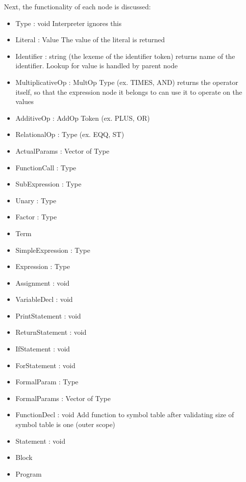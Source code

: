 Next, the functionality of each node is discussed:
\begin{itemize}
	\item Type : void
		\subitem Interpreter ignores this
	\item Literal : Value
		\subitem The value of the literal is returned
	\item Identifier : string (the lexeme of the identifier token)
		\subitem returns name of the identifier. Lookup for value is handled by parent node
	\item MultiplicativeOp : MultOp Type (ex. TIMES, AND)
		\subitem returns the operator itself, so that the expression node it belongs to can use it to operate on the values
	\item AdditiveOp : AddOp Token (ex. PLUS, OR)
		\subitem
	\item RelationalOp : Type (ex. EQQ, ST)
		\subitem
	\item ActualParams : Vector of Type
		\subitem
	\item FunctionCall : Type
		\subitem
		\subitem
		\subitem
	\item SubExpression : Type
		\subitem
	\item Unary : Type
		\subitem
	\item Factor : Type
		\subitem
	\item Term
		\subitem
	\item SimpleExpression : Type
		\subitem
		\subitem
	\item Expression : Type
		\subitem
	\item Assignment : void
		\subitem
		\subitem
	\item VariableDecl : void
		\subitem
		\subitem
	\item PrintStatement : void
		\subitem
	\item ReturnStatement : void
		\subitem
	\item IfStatement : void
		\subitem
		\subitem
		\subitem
		\subitem
		\subitem
	\item ForStatement : void
		\subitem
		\subitem
		\subitem
		\subitem
		\subitem
		\subitem
	\item FormalParam : Type
		\subitem
		\subitem
	\item FormalParams : Vector of Type
		\subitem
	\item FunctionDecl : void
		\subitem
		\subitem
	Add function to symbol table after validating size of symbol table is one (outer scope)
		\subitem
		\subitem
	\item Statement : void
		\subitem
		\subitem
	\item Block
		\subitem
	\item Program
		\subitem
\end{itemize}
